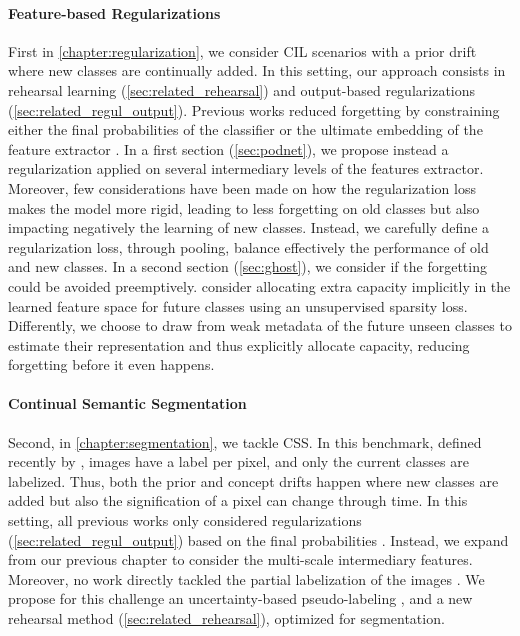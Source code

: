 \paragraph{Feature-based Regularizations} First in \autoref{chapter:regularization}, we consider
\acf{CIL} scenarios with a prior drift where new classes are continually added. In this setting, our
approach consists in rehearsal learning (\autoref{sec:related_rehearsal}) and output-based
regularizations (\autoref{sec:related_regul_output}). Previous works reduced forgetting by
constraining either the final probabilities of the classifier \citep{li2018lwf} or the ultimate
embedding of the feature extractor \citep{hou2019ucir,dhar2019learning_without_memorizing_gradcam}.
In a first section (\autoref{sec:podnet}), we propose instead a regularization applied on several
intermediary levels of the features extractor. Moreover, few considerations have been made on how
the regularization loss makes the model more rigid, leading to less forgetting on old classes but
also impacting negatively the learning of new classes. Instead, we carefully define a regularization
loss, through pooling, balance effectively the performance of old and new classes. In a second
section (\autoref{sec:ghost}), we consider if the forgetting could be avoided preemptively.
\cite{aljundi2019selfless} consider allocating extra capacity implicitly in the learned feature
space for future classes using an unsupervised sparsity loss. Differently, we choose to draw from
weak metadata of the future unseen classes \citep{hanrebuffi2020autodiscovering} to estimate their
representation and thus explicitly allocate capacity, reducing forgetting before it even happens.

\paragraph{Continual Semantic Segmentation} Second, in \autoref{chapter:segmentation}, we tackle
\acf{CSS}. In this benchmark, defined recently by \cite{cermelli2020modelingthebackground}, images
have a label per pixel, and only the current classes are labelized. Thus, both the prior and concept
drifts happen where new classes are added but also the signification of a pixel can change through
time. In this setting, all previous works only considered regularizations
(\autoref{sec:related_regul_output}) based on the final probabilities
\citep{michieli2019ilt,cermelli2020modelingthebackground}. Instead, we expand from our previous
chapter to consider the multi-scale intermediary features. Moreover, no work directly tackled the
partial labelization of the images \citep{cermelli2020modelingthebackground}. We propose for this
challenge an uncertainty-based pseudo-labeling \citep{saporta2020esl}, and a new rehearsal method
(\autoref{sec:related_rehearsal}), optimized for segmentation.

